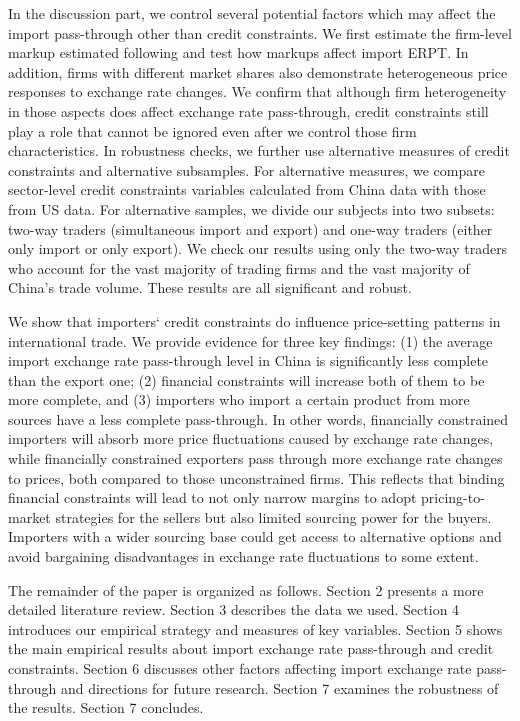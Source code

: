 In the discussion part, we control several potential factors which may affect the import pass-through other than credit constraints. We first estimate the firm-level markup estimated following \cite{dlw2012} and test how markups affect import ERPT. In addition, firms with different market shares also demonstrate heterogeneous price responses to exchange rate changes. We confirm that although firm heterogeneity in those aspects does affect exchange rate pass-through, credit constraints still play a role that cannot be ignored even after we control those firm characteristics. In robustness checks, we further use alternative measures of credit constraints and alternative subsamples. For alternative measures, we compare sector-level credit constraints variables calculated from China data with those from US data. For alternative samples, we divide our subjects into two subsets: two-way traders (simultaneous import and export) and one-way traders (either only import or only export). We check our results using only the two-way traders who account for the vast majority of trading firms and the vast majority of China's trade volume. These results are all significant and robust.

We show that importers‘ credit constraints do influence price-setting patterns in international trade. We provide evidence for three key findings: (1) the average import exchange rate pass-through level in China is significantly less complete than the export one; (2) financial constraints will increase both of them to be more complete, and (3) importers who import a certain product from more sources have a less complete pass-through. In other words, financially constrained importers will absorb more price fluctuations caused by exchange rate changes, while financially constrained exporters pass through more exchange rate changes to prices, both compared to those unconstrained firms. This reflects that binding financial constraints will lead to not only narrow margins to adopt pricing-to-market strategies for the sellers but also limited sourcing power for the buyers. Importers with a wider sourcing base could get access to alternative options and avoid bargaining disadvantages in exchange rate fluctuations to some extent.

The remainder of the paper is organized as follows. Section 2 presents a more detailed literature review. Section 3 describes the data we used. Section 4 introduces our empirical strategy and measures of key variables. Section 5 shows the main empirical results about import exchange rate pass-through and credit constraints. Section 6 discusses other factors affecting import exchange rate pass-through and directions for future research. Section 7 examines the robustness of the results. Section 7 concludes.

\newpage